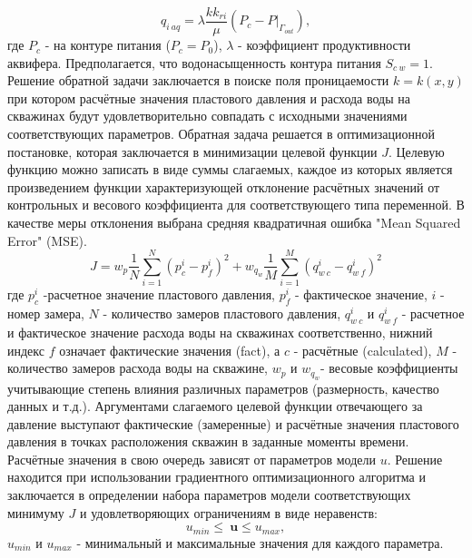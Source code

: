 \documentclass{article}
\begin{document}
\begin{equation*} \label{qaq}
q_{i\:aq} = \lambda \frac{kk_{ri}}{\mu}(P_c - P|_{\Gamma_{out}}),
\end{equation*}
где $P_{c}$ - на контуре питания ($P_c = P_0$), $\lambda$ - коэффициент продуктивности аквифера. Предполагается, что водонасыщенность контура питания $S_{c\:w} = 1$.
Решение обратной задачи заключается в поиске поля проницаемости $k = k(x,y)$ при котором расчётные значения пластового давления и расхода воды на скважинах будут удовлетворительно совпадать с исходными значениями соответствующих параметров. Обратная задача решается в оптимизационной постановке, которая заключается в минимизации целевой функции $J$. Целевую функцию можно записать в виде суммы слагаемых, каждое из которых является произведением функции характеризующей отклонение расчётных значений от контрольных и весового коэффициента для соответствующего типа переменной. В качестве меры отклонения выбрана средняя квадратичная ошибка "Mean Squared Error" (MSE). 
\begin{equation} \label{mse}
	J=w_p\frac{1}{N}\sum_{i=1}^N{\left(p_c^i-p_f^i\right)^2}+w_{q_w}\frac{1}{M}\sum_{i=1}^M{\left(q_{w\:c}^i-q_{w\:f}^i\right)^2}
\end{equation}
где $p_c^i$ -расчетное значение пластового давления, $p_f^i$ - фактическое значение, $i$ - номер замера, $N$ - количество замеров пластового давления, $q_{w\:c}^i$ и $q_{w\:f}^i$ - расчетное и фактическое значение расхода воды на скважинах соответственно, нижний индекс $f$ означает фактические значения (fact), а $c$ - расчётные (calculated), $M$ - количество замеров расхода воды на скважине, $w_p$ и $w_{q_w}$- весовые коэффициенты учитывающие степень влияния различных параметров (размерность, качество данных и т.д.). Аргументами слагаемого целевой функции отвечающего за давление выступают фактические (замеренные) и расчётные значения пластового давления в точках расположения скважин в заданные моменты времени.  
 Расчётные значения в свою очередь зависят от параметров модели $u$. Решение находится при использовании градиентного оптимизационного алгоритма и заключается в определении набора параметров модели соответствующих минимуму $J$ и удовлетворяющих ограничениям в виде неравенств:
\begin{equation*}
u_{min}\leq\ \boldsymbol{u}\leq u_{max},
\end{equation*}
$u_{min}$ и $u_{max}$ - минимальный и максимальные значения для каждого параметра.
\end{document}
